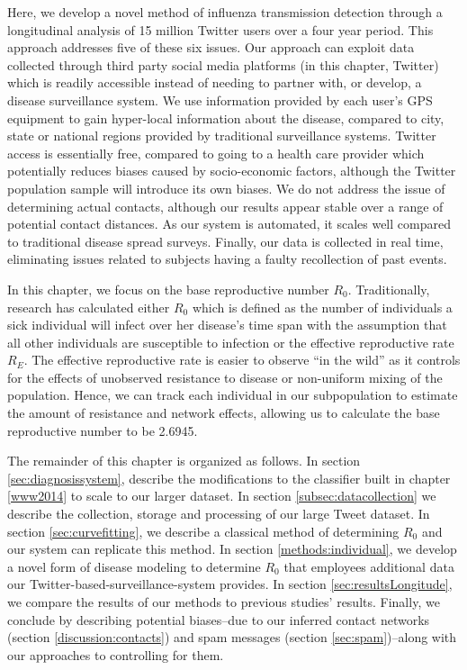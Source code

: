 Here, we develop a novel method of influenza transmission detection through a longitudinal analysis of 15 million Twitter users over a four year period. This approach addresses five of these six issues. Our approach can exploit data collected through third party social media platforms (in this chapter, Twitter) which is readily accessible instead of needing to partner with, or develop, a disease surveillance system. We use information provided by each user's GPS equipment to gain hyper-local information about the disease, compared to city, state or national regions provided by traditional surveillance systems. Twitter access is essentially free, compared to going to a health care provider which potentially reduces biases caused by socio-economic factors, although the Twitter population sample will introduce its own biases. We do not address the issue of determining actual contacts, although our results appear stable over a range of potential contact distances. As our system is automated, it scales well compared to traditional disease spread surveys. Finally, our data is collected in real time, eliminating issues related to subjects having a faulty recollection of past events.

In this chapter, we focus on the base reproductive number \(R_0\). Traditionally, research has calculated either \(R_0\) which is defined as the number of individuals a sick individual will infect over her disease's time span with the assumption that all other individuals are susceptible to infection or the effective reproductive rate \(R_E\).\cite{bilge2014uniqueness} The effective reproductive rate is easier to observe ``in the wild'' as it controls for the effects of unobserved resistance to disease or non-uniform mixing of the population.\cite{diekmann2012mathematical,heesterbeek2002brief} Hence, we can track each individual in our subpopulation to estimate the amount of resistance and network effects, allowing us to calculate the base reproductive number to be 2.6945.

The remainder of this chapter is organized as follows. In section \ref{sec:diagnosissystem}, describe the modifications to the classifier built in chapter \ref{www2014} to scale to our larger dataset. In section \ref{subsec:datacollection} we describe the collection, storage and processing of our large Tweet dataset. In section \ref{sec:curvefitting}, we describe a classical method of determining \(R_0\) and our system can replicate this method. In section \ref{methods:individual}, we develop a novel form of disease modeling to determine \(R_0\) that employees additional data our Twitter-based-surveillance-system provides. In section \ref{sec:resultsLongitude}, we compare the results of our methods to previous studies' results.  Finally, we conclude by describing potential biases--due to our inferred contact networks (section \ref{discussion:contacts}) and spam messages (section \ref{sec:spam})--along with our approaches to controlling for them.


